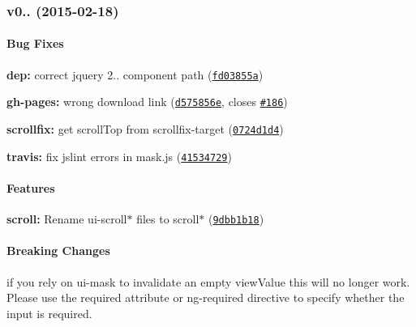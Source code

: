 \label{_v0.2.2}%
 \subsubsection*{v0.. (2015-\/02-\/18)}

\paragraph*{Bug Fixes}


\begin{DoxyItemize}
\item {\bfseries dep\+:} correct jquery 2.. component path (\href{http://github.com/angular-ui/ui-utils/commit/fd03855ac336d00ce19685f4df90b862e2f5c9b4}{\tt fd03855a})
\item {\bfseries gh-\/pages\+:} wrong download link (\href{http://github.com/angular-ui/ui-utils/commit/d575856e9ce575d40015d532d8a3684521f5d26d}{\tt d575856e}, closes \href{http://github.com/angular-ui/ui-utils/issues/186}{\tt \#186})
\item {\bfseries scrollfix\+:} get scroll\+Top from scrollfix-\/target (\href{http://github.com/angular-ui/ui-utils/commit/0724d1d41593d3d89ecd015026576570360f2f20}{\tt 0724d1d4})
\item {\bfseries travis\+:} fix jslint errors in mask.\+js (\href{http://github.com/angular-ui/ui-utils/commit/415347293d7200d8fc4a14b99e9744249e6c80da}{\tt 41534729})
\end{DoxyItemize}

\paragraph*{Features}


\begin{DoxyItemize}
\item {\bfseries scroll\+:} Rename ui-\/scroll$\ast$ files to scroll$\ast$ (\href{http://github.com/angular-ui/ui-utils/commit/9dbb1b185ac51bdce834405f7b43e514ad29d978}{\tt 9dbb1b18})
\end{DoxyItemize}

\paragraph*{Breaking Changes}


\begin{DoxyItemize}
\item if you rely on ui-\/mask to invalidate an empty view\+Value this will no longer work. Please use the required attribute or ng-\/required directive to specify whether the input is required.
\end{DoxyItemize}

